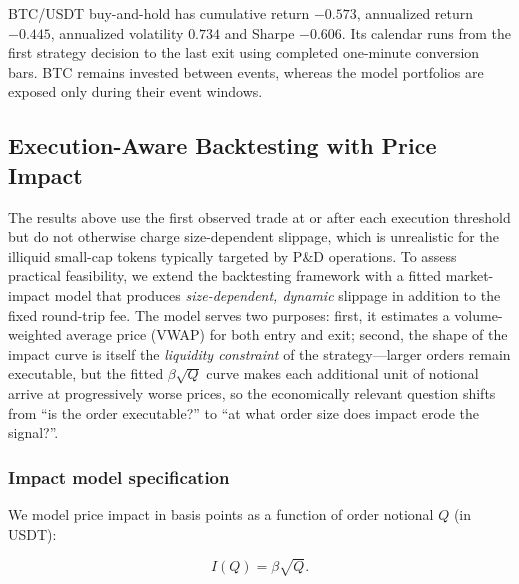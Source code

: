 \documentclass{ieeeaccess}
\begin{document}
BTC/USDT buy-and-hold \textcolor{revisionblue}{has} cumulative return $-0.573$, annualized return $-0.445$, annualized volatility $0.734$ and Sharpe $-0.606$. \textcolor{revisionblue}{Its calendar runs from the first strategy decision to the last exit using completed one-minute conversion bars.} BTC remains invested between events, whereas \textcolor{revisionblue}{the model portfolios are} exposed only during \textcolor{revisionblue}{their} event \textcolor{revisionblue}{windows.}

\subsection{Execution-Aware Backtesting with Price Impact}
\label{sec:price_impact}

The results above use the first observed trade at or after each execution threshold but do not otherwise charge size-dependent slippage, which is unrealistic for the illiquid small-cap tokens typically targeted by P\&D operations. To assess practical feasibility, we extend the backtesting framework with a fitted market-impact model that produces \emph{size-dependent, dynamic} slippage in addition to the fixed round-trip fee. The model serves two purposes: first, it estimates a volume-weighted average price (VWAP) for both entry and exit; second, the shape of the impact curve is itself the \emph{liquidity constraint} of the strategy---larger orders remain executable, but the fitted $\beta\sqrt{Q}$ curve makes each additional unit of notional arrive at progressively worse prices, so the economically relevant question shifts from ``is the order executable?'' to ``at what order size does impact erode the signal?''.

\subsubsection{Impact model specification}
We model price impact in basis points as a function of order notional $Q$ (in USDT):

\begin{equation}
    I(Q) = \beta \sqrt{Q}.
    \label{eq:impact_model}
\end{equation}
\end{document}
